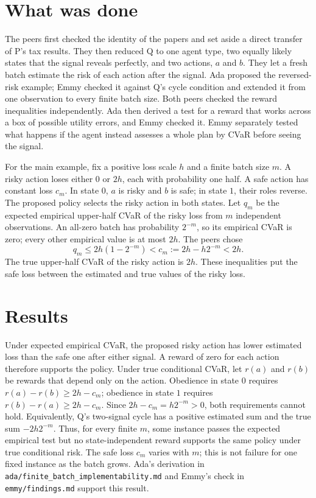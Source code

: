 \documentclass{article}
\begin{document}
\section{What was done}

The peers first checked the identity of the papers and set aside a direct transfer of P's tax results. They
then reduced Q to one agent type, two equally likely states that the signal reveals perfectly, and two
actions, \(a\) and \(b\). They let a fresh batch estimate the risk of each action after the signal. Ada
proposed the reversed-risk example; Emmy checked it against Q's cycle condition and extended it from one
observation to every finite batch size. Both peers checked the reward inequalities independently. Ada then
derived a test for a reward that works across a box of possible utility errors, and Emmy checked it. Emmy
separately tested what happens if the agent instead assesses a whole plan by CVaR before seeing the signal.

For the main example, fix a positive loss scale \(h\) and a finite batch size \(m\). A risky action loses
either \(0\) or \(2h\), each with probability one half. A safe action has constant loss \(c_m\). In state
\(0\), \(a\) is risky and \(b\) is safe; in state \(1\), their roles reverse. The proposed policy selects the
risky action in both states. Let \(q_m\) be the expected empirical upper-half CVaR of the risky loss from
\(m\) independent observations. An all-zero batch has probability \(2^{-m}\), so its empirical CVaR is zero;
every other empirical value is at most \(2h\). The peers chose
\[
q_m\leq 2h(1-2^{-m})<c_m:=2h-h2^{-m}<2h.
\]
The true upper-half CVaR of the risky action is \(2h\). These inequalities put the safe loss between the
estimated and true values of the risky loss.

\section{Results}

Under expected empirical CVaR, the proposed risky action has lower estimated loss than the safe one after
either signal. A reward of zero for each action therefore supports the policy. Under true conditional CVaR,
let \(r(a)\) and \(r(b)\) be rewards that depend only on the action. Obedience in state \(0\) requires
\(r(a)-r(b)\geq 2h-c_m\); obedience in state \(1\) requires \(r(b)-r(a)\geq 2h-c_m\). Since
\(2h-c_m=h2^{-m}>0\), both requirements cannot hold. Equivalently, Q's two-signal cycle has a positive
estimated sum and the true sum \(-2h2^{-m}\). Thus, for every finite \(m\), some instance passes the expected
empirical test but no state-independent reward supports the same policy under true conditional risk. The safe
loss \(c_m\) varies with \(m\); this is not failure for one fixed instance as the batch grows. Ada's
derivation in \texttt{ada/finite\_batch\_implementability.md} and Emmy's check in \texttt{emmy/findings.md}
support this result.
\end{document}
